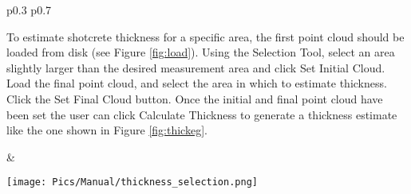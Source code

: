 \begin{tabularx}{\textwidth}{p{0.3\textwidth} p{0.7\textwidth} }
    \\ \midrule
\begin{minipage}{.3\textwidth} 	
\scriptsize
\raggedright
       To estimate shotcrete thickness for a specific area, the first point cloud should be loaded from disk (see Figure \ref{fig:load}). Using the Selection Tool, select an area slightly larger than the desired measurement area and click Set Initial Cloud. Load the final point cloud, and select the area in which to estimate thickness. Click the Set Final Cloud button. Once the initial and final point cloud have been set the user can click Calculate Thickness to generate a thickness estimate like the one shown in Figure \ref{fig:thickeg}.
      \end{minipage}%
      &
        \begin{minipage}{.7\textwidth}
        \vspace{1pt}
      \begin{center}
            \texttt{[image: Pics/Manual/thickness\_selection.png]}
		\end{center}
    \end{minipage}\\
\end{tabularx}
